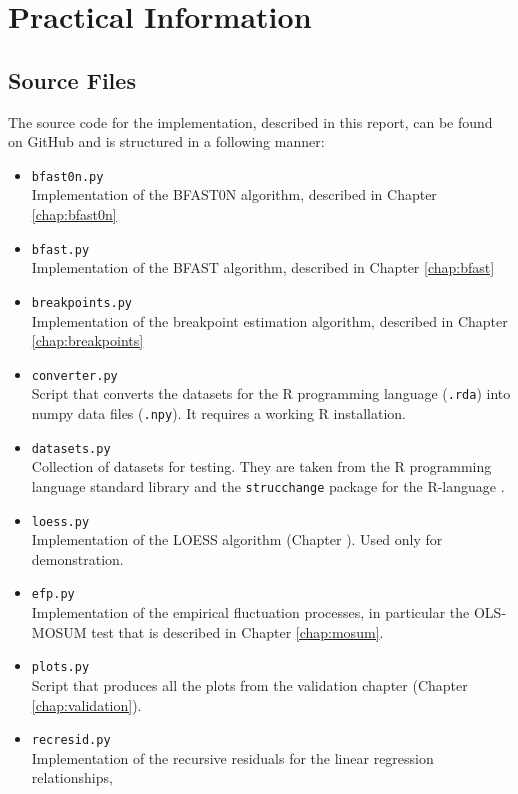 \documentclass[main.tex]{subfiles}
\begin{document}
\chapter{Practical Information}
\label{a_chap:practical}
\section*{Source Files}
\label{sec:source_files}
The source code for the implementation, described in this report, can be found
on GitHub \cite{my-github} and is structured in a following manner:
\begin{itemize}
\item \texttt{bfast0n.py}\\
  Implementation of the BFAST0N algorithm, described in Chapter \ref{chap:bfast0n}
\item \texttt{bfast.py}\\
  Implementation of the BFAST algorithm, described in Chapter \ref{chap:bfast}
\item \texttt{breakpoints.py}\\
  Implementation of the breakpoint estimation algorithm, described in Chapter \ref{chap:breakpoints}
\item \texttt{converter.py}\\
  Script that converts the datasets for the R programming language (\texttt{.rda}) into numpy
  data files (\texttt{.npy}). It requires a working R installation.
\item \texttt{datasets.py}\\
  Collection of datasets for testing. They are taken from the R programming language standard library
  \cite{r-datasets} and
  the \texttt{strucchange} package for the R-language \cite{strucchange_code}.
\item \texttt{loess.py}\\
  Implementation of the LOESS algorithm (Chapter \cite{chap:stl}). Used only for demonstration.
\item \texttt{efp.py}\\
  Implementation of the empirical fluctuation processes, in particular the OLS-MOSUM test that is
  described in Chapter \ref{chap:mosum}.
\item \texttt{plots.py}\\
  Script that produces all the plots from the validation chapter (Chapter \ref{chap:validation}).
\item \texttt{recresid.py}\\
  Implementation of the recursive residuals for the linear regression relationships,

\end{itemize}
\end{document}
